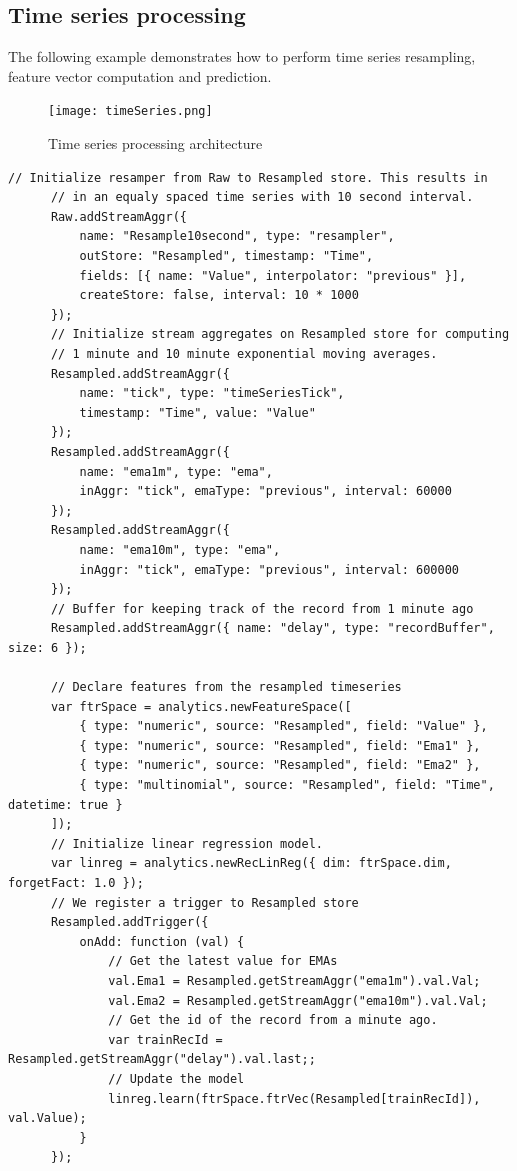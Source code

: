 \documentclass{article} %
\begin{document}
\subsection{Time series processing}

The following example demonstrates how to perform time series resampling, feature vector computation and prediction.

      \begin{figure}[h]
      \begin{center}
      \texttt{[image: timeSeries.png]}
      \end{center}
      \caption{Time series processing architecture}
      \end{figure}

      \begin{lstlisting}[caption=Time series processing] 	
      // Initialize resamper from Raw to Resampled store. This results in
      // in an equaly spaced time series with 10 second interval.
      Raw.addStreamAggr({
          name: "Resample10second", type: "resampler",
          outStore: "Resampled", timestamp: "Time",
          fields: [{ name: "Value", interpolator: "previous" }],
          createStore: false, interval: 10 * 1000
      });
      // Initialize stream aggregates on Resampled store for computing
      // 1 minute and 10 minute exponential moving averages.
      Resampled.addStreamAggr({
          name: "tick", type: "timeSeriesTick",
          timestamp: "Time", value: "Value"
      });
      Resampled.addStreamAggr({
          name: "ema1m", type: "ema",
          inAggr: "tick", emaType: "previous", interval: 60000
      });
      Resampled.addStreamAggr({
          name: "ema10m", type: "ema",
          inAggr: "tick", emaType: "previous", interval: 600000
      });
      // Buffer for keeping track of the record from 1 minute ago
      Resampled.addStreamAggr({ name: "delay", type: "recordBuffer", size: 6 });

      // Declare features from the resampled timeseries
      var ftrSpace = analytics.newFeatureSpace([
          { type: "numeric", source: "Resampled", field: "Value" },
          { type: "numeric", source: "Resampled", field: "Ema1" },
          { type: "numeric", source: "Resampled", field: "Ema2" },
          { type: "multinomial", source: "Resampled", field: "Time", datetime: true }
      ]);
      // Initialize linear regression model.
      var linreg = analytics.newRecLinReg({ dim: ftrSpace.dim, forgetFact: 1.0 });
      // We register a trigger to Resampled store
      Resampled.addTrigger({
          onAdd: function (val) {
              // Get the latest value for EMAs
              val.Ema1 = Resampled.getStreamAggr("ema1m").val.Val;
              val.Ema2 = Resampled.getStreamAggr("ema10m").val.Val;
              // Get the id of the record from a minute ago.
              var trainRecId = Resampled.getStreamAggr("delay").val.last;;
              // Update the model
              linreg.learn(ftrSpace.ftrVec(Resampled[trainRecId]), val.Value);
          }
      });
      \end{lstlisting}
\end{document}
